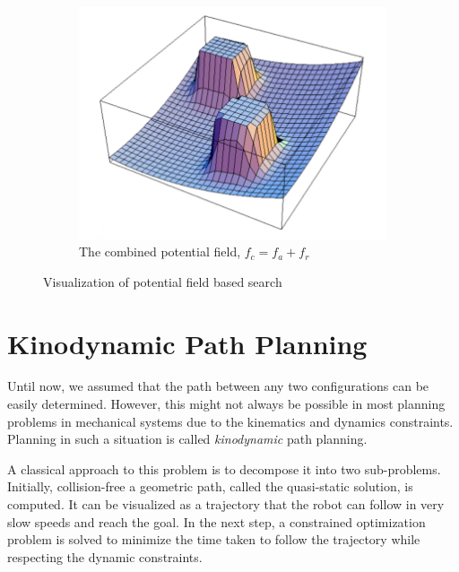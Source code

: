 \begin{figure}
\begin{subfigure}[b]{0.3\textwidth}
		\label{fig:potential_obs}    
	\end{subfigure}
    ~\begin{subfigure}[b]{0.3\textwidth}
        \includegraphics[width=\textwidth]{./images/potential_combined}
		\caption{The combined potential field, $f_c=f_a+f_r$}
		\label{fig:potential_combined}    
	\end{subfigure}	
    \caption[Visualization of potential field based search]{Visualization of potential field based search \cite{lavalle2006planning}}
    \label{fig:potential}
\end{figure}

\section{Kinodynamic Path Planning}
\label{sec:kinodynamic}
Until now, we assumed that the path between any two configurations can be easily determined. However, this might not always be possible in most planning problems in mechanical systems due to the kinematics and dynamics constraints. Planning in such a situation is called \textit{kinodynamic} path planning. 

A classical approach to this problem is to decompose it into two sub-problems. Initially, collision-free a geometric path, called the quasi-static solution, is computed. It can be visualized as a trajectory that the robot can follow in very slow speeds and reach the goal. In the next step, a constrained optimization problem is solved to minimize the time taken to follow the trajectory while respecting the dynamic constraints. 

